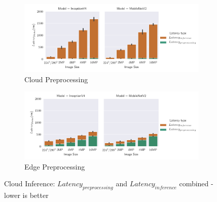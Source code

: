 \begin{figure}[!htb]
\centering
\begin{subfigure}[b]{0.95\textwidth}
   \includegraphics[width=1\linewidth]{./Bilder/single_plots/cloud_inference_plots/Cloud_Preprocessing_Inference_Comb_cloud_prepro.pdf}
   \caption{Cloud Preprocessing}
   \label{fig:CloudInference+PreproCloud} 
\end{subfigure}

\begin{subfigure}[b]{0.95\textwidth}
   \includegraphics[width=1\linewidth]{./Bilder/single_plots/cloud_inference_plots/Cloud_Preprocessing_Inference_Comb_edge_prepro.pdf}
   \caption{Edge Preprocessing}
   \label{fig:CloudInference+PreproEdge}
\end{subfigure}

\caption{Cloud Inference:  $Latency_{preprocessing}$ and $Latency_{inference}$ combined - lower is better}
\end{figure}

